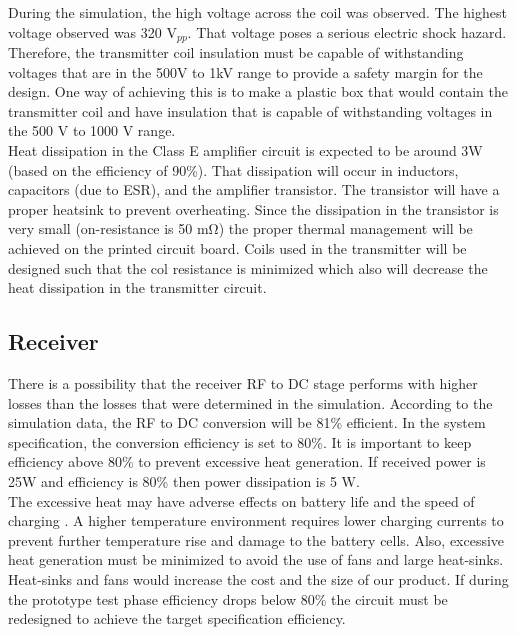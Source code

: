 \documentclass[12pt]{article}
\begin{document}
\indent
During the simulation, the high voltage across the coil was observed. The highest voltage observed was 320 V$_{pp}$. That voltage poses a serious electric shock hazard. Therefore, the transmitter coil insulation must be capable of withstanding voltages that are in the 500V to 1kV range to provide a safety margin for the design. One way of achieving this is to make a plastic box that would contain the transmitter coil and have insulation that is capable of withstanding voltages in the 500 V to 1000 V range.  \\

\indent
Heat dissipation in the Class E amplifier circuit is expected to be around 3W (based on the efficiency of 90\%). That dissipation will occur in inductors, capacitors (due to ESR), and the amplifier transistor. The transistor will have a proper heatsink to prevent overheating. Since the dissipation in the transistor is very small (on-resistance is 50 mΩ) the proper thermal management will be achieved on the printed circuit board. Coils used in the transmitter will be designed such that the col resistance is minimized which also will decrease the heat dissipation in the transmitter circuit.

\subsection{Receiver}

\indent \indent
There is a possibility that the receiver RF to DC stage performs with higher losses than the losses that were determined in the simulation. According to the simulation data, the RF to DC conversion will be 81\% efficient. In the system specification, the conversion efficiency is set to 80\%. It is important to keep efficiency above 80\% to prevent excessive heat generation. If received power is 25W and efficiency is  80\% then power dissipation is 5 W.   \\

\indent
The excessive heat may have adverse effects on battery life and the speed of charging \cite{TPSM265R1}. A higher temperature environment requires lower charging currents to prevent further temperature rise and damage to the battery cells. Also, excessive heat generation must be minimized to avoid the use of fans and large heat-sinks. Heat-sinks and fans would increase the cost and the size of our product.   If during the prototype test phase efficiency drops below 80\% the circuit must be redesigned to achieve the target specification efficiency. \\
\end{document}
